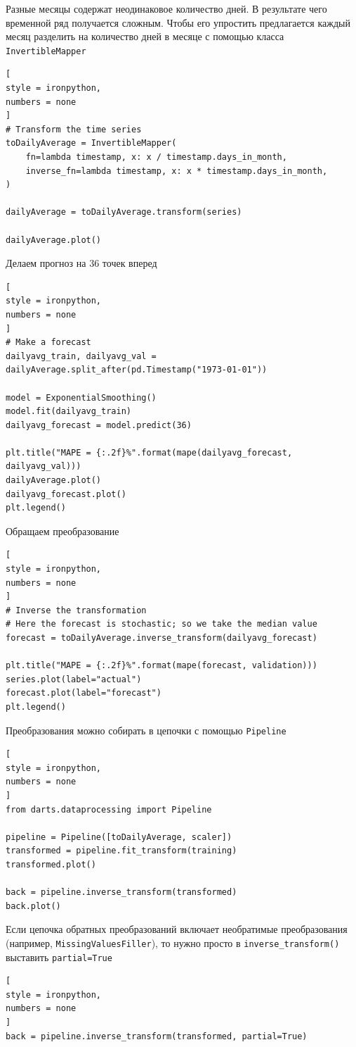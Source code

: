 \documentclass[%
	11pt,
	a4paper,
	utf8,
		]{article}
\begin{document}
Разные месяцы содержат неодинаковое количество дней. В результате чего временной ряд получается сложным. Чтобы его упростить предлагается каждый месяц разделить на количество дней в месяце с помощью класса \verb|InvertibleMapper|
\begin{lstlisting}[
style = ironpython,
numbers = none
]
# Transform the time series
toDailyAverage = InvertibleMapper(
	fn=lambda timestamp, x: x / timestamp.days_in_month,
	inverse_fn=lambda timestamp, x: x * timestamp.days_in_month,
)

dailyAverage = toDailyAverage.transform(series)

dailyAverage.plot()
\end{lstlisting}

Делаем прогноз на 36 точек вперед
\begin{lstlisting}[
style = ironpython,
numbers = none
]
# Make a forecast
dailyavg_train, dailyavg_val = dailyAverage.split_after(pd.Timestamp("1973-01-01"))

model = ExponentialSmoothing()
model.fit(dailyavg_train)
dailyavg_forecast = model.predict(36)

plt.title("MAPE = {:.2f}%".format(mape(dailyavg_forecast, dailyavg_val)))
dailyAverage.plot()
dailyavg_forecast.plot()
plt.legend()
\end{lstlisting}

Обращаем преобразование
\begin{lstlisting}[
style = ironpython,
numbers = none
]
# Inverse the transformation
# Here the forecast is stochastic; so we take the median value
forecast = toDailyAverage.inverse_transform(dailyavg_forecast)

plt.title("MAPE = {:.2f}%".format(mape(forecast, validation)))
series.plot(label="actual")
forecast.plot(label="forecast")
plt.legend()
\end{lstlisting}

Преобразования можно собирать в цепочки с помощью \verb|Pipeline|
\begin{lstlisting}[
style = ironpython,
numbers = none
]
from darts.dataprocessing import Pipeline

pipeline = Pipeline([toDailyAverage, scaler])
transformed = pipeline.fit_transform(training)
transformed.plot()

back = pipeline.inverse_transform(transformed)
back.plot()
\end{lstlisting}

Если цепочка обратных преобразований включает необратимые преобразования (например, \verb|MissingValuesFiller|), то нужно просто в \verb|inverse_transform()| выставить \verb|partial=True|
\begin{lstlisting}[
style = ironpython,
numbers = none
]
back = pipeline.inverse_transform(transformed, partial=True)
\end{lstlisting}
\end{document}
